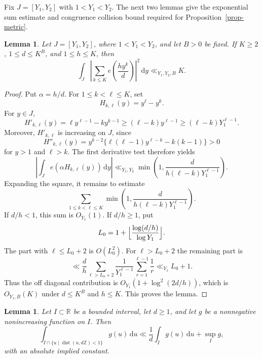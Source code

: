 \documentclass[11pt,reqno]{amsart}
\numberwithin{equation}{section}
\newtheorem{lemma}[theorem]{Lemma}
\begin{document}
    Fix $J=[Y_1,Y_2]$ with $1<Y_1<Y_2$. The next two lemmas give the exponential sum estimate and congruence collision bound required for Proposition~\ref{prop-metric}.

    \begin{lemma}\label{lem-exp-sum}
        Let $J=[Y_1,Y_2]$, where $1<Y_1<Y_2$, and let $B>0$ be fixed. If $K\ge2$, $1\le d\le K^B$, and $1\le h\le K$, then
        $$
        \int_J\left|\sum_{k\le K}e\left(\frac{h y^k}{d}\right)\right|^2\,\mathrm{d}y
        \ll_{Y_1,Y_2,B} K.
        $$
    \end{lemma}

    \begin{proof}
        Put $\alpha=h/d$. For $1\le k<\ell\le K$, set
        $$
        H_{k,\ell}(y)=y^\ell-y^k.
        $$
        For $y\in J$,
        $$
        H'_{k,\ell}(y)=\ell y^{\ell-1}-k y^{k-1}
        \ge (\ell-k)y^{\ell-1}
        \ge (\ell-k)Y_1^{\ell-1}.
        $$
        Moreover, $H'_{k,\ell}$ is increasing on $J$, since
        $$
        H''_{k,\ell}(y)=y^{k-2}\{\ell(\ell-1)y^{\ell-k}-k(k-1)\}>0
        $$
        for $y>1$ and $\ell>k$. The first derivative test therefore yields
        $$
        \left|\int_J e(\alpha H_{k,\ell}(y))\,\mathrm{d}y\right|
        \ll_{Y_1,Y_2}
        \min\left(1,\frac{d}{h(\ell-k)Y_1^{\ell-1}}\right).
        $$
        Expanding the square, it remains to estimate
        $$
        \sum_{1\le k<\ell\le K}
        \min\left(1,\frac{d}{h(\ell-k)Y_1^{\ell-1}}\right).
        $$
        If $d/h<1$, this sum is $O_{Y_1}(1)$. If $d/h\ge1$, put
        $$
        L_0=1+\Bigl\lfloor\frac{\log(d/h)}{\log Y_1}\Bigr\rfloor.
        $$
        The part with $\ell\le L_0+2$ is $O(L_0^2)$. For $\ell>L_0+2$ the remaining part is
        $$
        \ll \frac{d}{h}
        \sum_{\ell>L_0+2}\frac{1}{Y_1^{\ell-1}}
        \sum_{r=1}^{\ell-1}\frac1r
        \ll_{Y_1} L_0+1.
        $$
        Thus the off diagonal contribution is $O_{Y_1}(1+\log^2(2d/h))$, which is $O_{Y_1,B}(K)$ under $d\le K^B$ and $h\le K$. This proves the lemma.
    \end{proof}

    \begin{lemma}\label{lem-decreasing-weight}
        Let $I\subset\mathbb{R}$ be a bounded interval, let $d\ge1$, and let $g$ be a nonnegative nonincreasing function on $I$. Then
        $$
        \int_{I\cap\{u\mid \operatorname{dist}(u,d\mathbb{Z})<1\}} g(u)\,\mathrm{d}u
        \ll \frac1d\int_I g(u)\,\mathrm{d}u+\sup_I g,
        $$
        with an absolute implied constant.
    \end{lemma}
\end{document}
